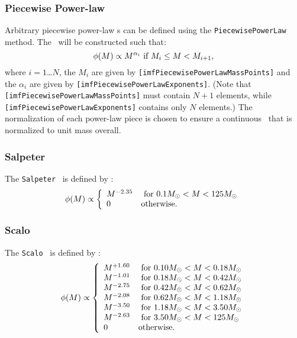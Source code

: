 \subsubsection{Piecewise Power-law}

Arbitrary piecewise power-law {\IMF}s can be defined using the {\tt PiecewisePowerLaw} method. The \IMF\ will be constructed such that:
\begin{equation}
 \phi(M) \propto M^{\alpha_i} \hbox{ if } M_i \le M < M_{i+1},
\end{equation}
where $i=1$\ldots$N$, the $M_i$ are given by {\tt [imfPiecewisePowerLawMassPoints]} and the $\alpha_i$ are given by {\tt [imfPiecewisePowerLawExponents]}. (Note that {\tt [imfPiecewisePowerLawMassPoints]} must contain $N+1$ elements, while {\tt [imfPiecewisePowerLawExponents]} contains only $N$ elements.) The normalization of each power-law piece is chosen to ensure a continuous \IMF\ that is normalized to unit mass overall.

\subsubsection{Salpeter}

The {\tt Salpeter} \IMF\ is defined by \citep{salpeter_luminosity_1955}:
\begin{equation}
 \phi(M) \propto \left\{ \begin{array}{ll} M^{-2.35} & \hbox{ for } 0.1M_\odot < M < 125M_\odot \\ 0 & \hbox {otherwise.} \end{array} \right.
\end{equation}

\subsubsection{Scalo}

The {\tt Scalo} \IMF\ is defined by \citep{scalo_stellar_1986}:
\begin{equation}
 \phi(M) \propto \left\{ \begin{array}{ll}
 M^{+1.60} & \hbox{ for } 0.10M_\odot < M < 0.18M_\odot \\
 M^{-1.01} & \hbox{ for } 0.18M_\odot < M < 0.42M_\odot \\
 M^{-2.75} & \hbox{ for } 0.42M_\odot < M < 0.62M_\odot \\
 M^{-2.08} & \hbox{ for } 0.62M_\odot < M < 1.18M_\odot \\
 M^{-3.50} & \hbox{ for } 1.18M_\odot < M < 3.50M_\odot \\
 M^{-2.63} & \hbox{ for } 3.50M_\odot < M < 125M_\odot \\
 0 & \hbox {otherwise.} \end{array} \right.
\end{equation}







